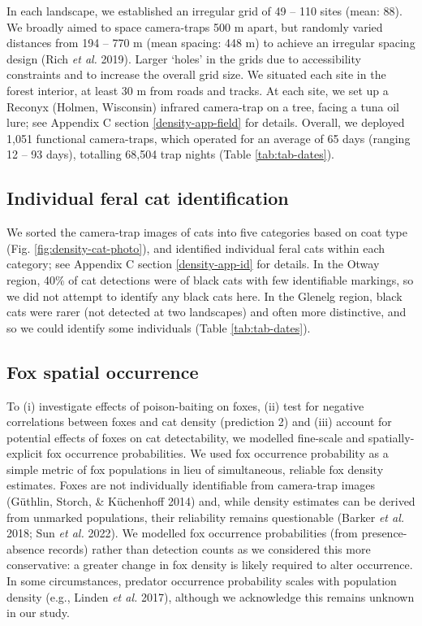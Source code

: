 \documentclass[preprint, 3p, authoryear]{elsarticle} %
\begin{document}
In each landscape, we established an irregular grid of 49 -- 110 sites (mean: 88). We broadly aimed to space camera-traps 500 m apart, but randomly varied distances from 194 -- 770 m (mean spacing: 448 m) to achieve an irregular spacing design (Rich \emph{et al.} 2019). Larger `holes' in the grids due to accessibility constraints and to increase the overall grid size. We situated each site in the forest interior, at least 30 m from roads and tracks. At each site, we set up a Reconyx (Holmen, Wisconsin) infrared camera-trap on a tree, facing a tuna oil lure; see Appendix C section \ref{density-app-field} for details. Overall, we deployed 1,051 functional camera-traps, which operated for an average of 65 days (ranging 12 -- 93 days), totalling 68,504 trap nights (Table \ref{tab:tab-dates}).

\hypertarget{individual-feral-cat-identification}{%
\subsection{Individual feral cat identification}\label{individual-feral-cat-identification}}

We sorted the camera-trap images of cats into five categories based on coat type (Fig. \ref{fig:density-cat-photo}), and identified individual feral cats within each category; see Appendix C section \ref{density-app-id} for details. In the Otway region, 40\% of cat detections were of black cats with few identifiable markings, so we did not attempt to identify any black cats here. In the Glenelg region, black cats were rarer (not detected at two landscapes) and often more distinctive, and so we could identify some individuals (Table \ref{tab:tab-dates}).

\hypertarget{density-methods-fox}{%
\subsection{Fox spatial occurrence}\label{density-methods-fox}}

To (i) investigate effects of poison-baiting on foxes, (ii) test for negative correlations between foxes and cat density (prediction 2) and (iii) account for potential effects of foxes on cat detectability, we modelled fine-scale and spatially-explicit fox occurrence probabilities. We used fox occurrence probability as a simple metric of fox populations in lieu of simultaneous, reliable fox density estimates. Foxes are not individually identifiable from camera-trap images (Güthlin, Storch, \& Küchenhoff 2014) and, while density estimates can be derived from unmarked populations, their reliability remains questionable (Barker \emph{et al.} 2018; Sun \emph{et al.} 2022). We modelled fox occurrence probabilities (from presence-absence records) rather than detection counts as we considered this more conservative: a greater change in fox density is likely required to alter occurrence. In some circumstances, predator occurrence probability scales with population density (e.g., Linden \emph{et al.} 2017), although we acknowledge this remains unknown in our study.
\end{document}
